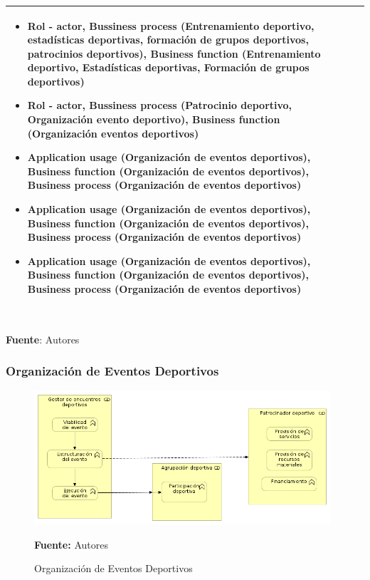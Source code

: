 \begin{table}[!htb]
\begin{center}
{\begin{tabular}{|p{7cm}|p{4cm}|}
\begin{itemize}
				\item Rol - actor, Bussiness process (Entrenamiento deportivo, estadísticas deportivas, formación de grupos deportivos, patrocinios deportivos), Business function (Entrenamiento deportivo, Estadísticas deportivas, Formación de grupos deportivos)
				\item Rol - actor, Bussiness process (Patrocinio deportivo, Organización evento deportivo), Business function (Organización eventos deportivos)
				\item Application usage (Organización de eventos deportivos), Business function (Organización de eventos deportivos), Business process (Organización de eventos deportivos)
				\item Application usage (Organización de eventos deportivos), Business function (Organización de eventos deportivos), Business process (Organización de eventos deportivos)
				\item Application usage (Organización de eventos deportivos), Business function (Organización de eventos deportivos), Business process (Organización de eventos deportivos)
			\end{itemize} 
			\\
			\hline
		\end{tabular}
		} \\
		\textbf{Fuente}: Autores
	\end{center}
\end{table}

\subsubsection{Organización de Eventos Deportivos}

\begin{figure}[!htb]
  \begin{center}
    \includegraphics[width=11cm]{./imagenes/business_functions/organizacioneventosdeportivos.png}
    \caption{Organización de Eventos Deportivos}
    \label{fig:organizacion_eventos_deportivos}
    \textbf{Fuente:}  Autores
  \end{center}
\end{figure}

